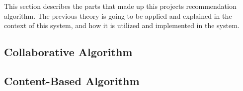 This section describes the parts that made up this projects recommendation algorithm. The previous theory is going to be applied and explained in the context of this system, and how it is utilized and implemented in the system.

\subsection{Collaborative Algorithm}
\label{CollaborativeAlg}

\subsection{Content-Based Algorithm}
\label{ContentBasedAlg}
